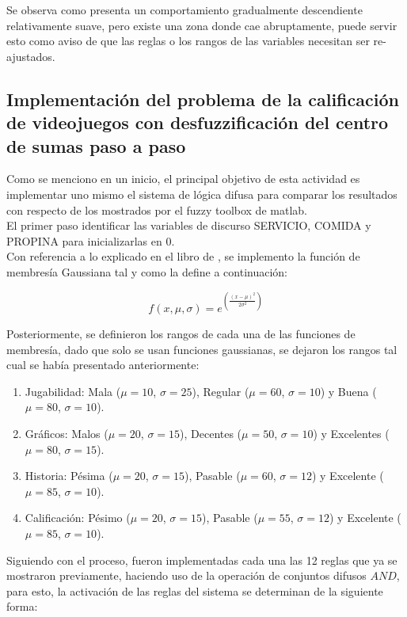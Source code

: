 \documentclass[11pt, letterpaper]{article}
\begin{document}
Se observa como presenta un comportamiento gradualmente descendiente relativamente suave, pero existe una zona donde cae abruptamente, puede servir esto como aviso de que las reglas o los rangos de las variables necesitan ser re-ajustados.

\newpage

\subsection{Implementación del problema de la calificación de videojuegos con desfuzzificación del centro de sumas paso a paso}

Como se menciono en un inicio, el principal objetivo de esta actividad es implementar uno mismo el sistema de lógica difusa para comparar los resultados con respecto de los mostrados por el fuzzy toolbox de matlab.\\

El primer paso  identificar las variables de discurso SERVICIO, COMIDA y PROPINA para inicializarlas en 0.\\

Con referencia a lo explicado en el libro de \cite{Cisneros2004}, se implemento la función de membresía Gaussiana tal y como la define a continuación:

\[
f(x, \mu, \sigma) = e^{\left( \frac{(x - \mu)^2}{2\sigma^2} \right)}
\]

Posteriormente, se definieron los rangos de cada una de las funciones de membresía, dado que solo se usan funciones gaussianas, se dejaron los rangos tal cual se había presentado anteriormente:

\begin{enumerate}
\item Jugabilidad: Mala ($\mu = 10$, $\sigma = 25$), Regular ($\mu = 60$, $\sigma = 10$) y Buena ($\mu = 80$, $\sigma = 10$).
\item Gráficos: Malos ($\mu = 20$, $\sigma = 15$), Decentes ($\mu = 50$, $\sigma = 10$) y Excelentes ($\mu = 80$, $\sigma = 15$).
\item Historia: Pésima ($\mu = 20$, $\sigma = 15$), Pasable ($\mu = 60$, $\sigma = 12$) y Excelente ($\mu = 85$, $\sigma = 10$).
\item Calificación: Pésimo ($\mu = 20$, $\sigma = 15$), Pasable ($\mu = 55$, $\sigma = 12$) y Excelente ($\mu = 85$, $\sigma = 10$).
\end{enumerate} 


Siguiendo con el proceso, fueron implementadas cada una las 12 reglas que ya se mostraron previamente, haciendo uso de la operación de conjuntos difusos $AND$, para esto, la activación de las reglas del sistema se determinan de la siguiente forma:
\end{document}
